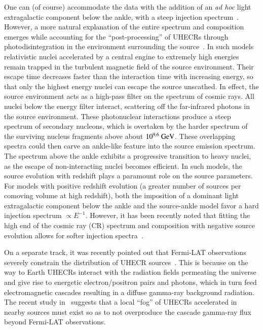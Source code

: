 \documentclass[aps,prd,twocolumn,superscriptaddress,tightenlines,nofootinbib]{revtex4-1}
\begin{document}
One can (of course) accommodate the data with the addition of an {\it
  ad hoc} light extragalactic component below the ankle, with a steep
injection spectrum~\cite{Aloisio:2013hya}. However, a more natural
explanation of the entire spectrum and composition emerges while
accounting for the ``post-processing'' of UHECRs through
photodisintegration in the environment surrounding the
source~\cite{Unger:2015laa,Farrar:2015ikt,Globus:2015xga,Anchordoqui:2014pca}.  In such 
models relativistic nuclei accelerated by a central engine to
extremely high energies remain trapped in the turbulent magnetic field
of the source environment. Their escape time decreases faster than the
interaction time with increasing energy, so that only the highest
energy nuclei can escape the source unscathed. In effect, the
source environment acts as a high-pass filter on the spectrum of
cosmic rays. All nuclei below the energy filter interact, scattering
off the far-infrared photons in the source environment.  These
photonuclear interactions produce a steep spectrum of secondary
nucleons, which is overtaken by the harder spectrum of the surviving
nucleus fragments above about $10^{9.6}~{\rm GeV}$. These overlapping
spectra could then carve an ankle-like feature into the source
emission spectrum. The spectrum above the ankle exhibits a progressive
transition to heavy nuclei, as the escape of non-interacting nuclei
becomes efficient. In such models, the source evolution with
redshift plays a paramount role on the source parameters. For models
with positive redshift evolution (a greater number of sources per
comoving volume at high redshift), both the imposition of a dominant
light extragalactic component below the ankle and the source-ankle
model favor a hard injection spectrum $\propto E^{-1}$. However, it
has been recently noted that fitting the high end of the cosmic ray (CR) spectrum
and composition with negative source evolution allows for softer
injection spectra~\cite{Taylor:2015rla}. 

On a separate track, it was recently pointed out that Fermi-LAT
observations~\cite{Ackermann:2014usa,TheFermi-LAT:2015ykq} severely
constrain the distribution of UHECR sources~\cite{Liu:2016brs}.  This
is because on the way to Earth UHECRs interact with the radiation
fields permeating the universe and give rise to energetic
electron/positron pairs and photons, which in turn feed
electromagnetic cascades resulting in a diffuse gamma-ray background
radiation. The recent study in~\cite{Liu:2016brs} suggests that a
local ``fog'' of UHECRs accelerated in nearby sources must exist so as
to not overproduce the cascade gamma-ray flux beyond Fermi-LAT
observations.
\end{document}
